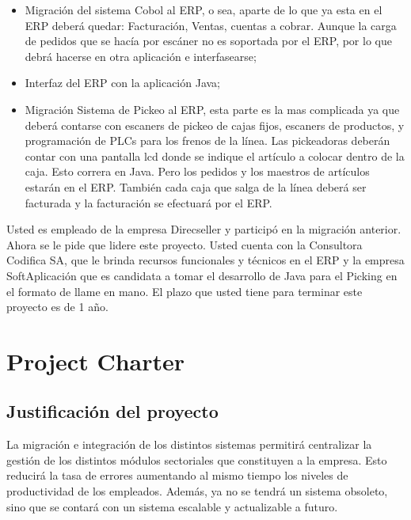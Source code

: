 \documentclass{article}
\begin{document}
	\begin{itemize}
		\itemsep=3pt \topsep=0pt \partopsep=0pt \parskip=0pt \parsep=0pt

		\item Migración del sistema Cobol al ERP, o sea, aparte de lo que ya esta en el ERP deberá quedar: Facturación, Ventas, cuentas a cobrar. Aunque la carga de pedidos que se hacía por escáner no es soportada por el ERP, por lo que debrá hacerse en otra aplicación e interfasearse;

		\item Interfaz del ERP con la aplicación Java;

		\item Migración Sistema de Pickeo al ERP, esta parte es la mas complicada ya que deberá contarse con escaners de pickeo de cajas fijos, escaners de productos, y programación de PLCs para los frenos de la línea. Las pickeadoras deberán contar con una pantalla lcd donde se indique el artículo a colocar dentro de la caja. Esto correra en Java. Pero los pedidos y los maestros de artículos estarán en el ERP. También cada caja que salga de la línea deberá ser facturada y la facturación se efectuará por el ERP.

	\end{itemize}
	\medskip

	Usted es empleado de la empresa Direcseller y participó en la migración anterior. Ahora se le pide que lidere este proyecto. Usted cuenta con la Consultora Codifica SA, que le brinda recursos funcionales y técnicos en el ERP y la empresa SoftAplicación que es candidata a tomar el desarrollo de Java para el Picking en el formato de llame en mano. El plazo que usted tiene para terminar este proyecto es de 1 año.

\bigskip




%
%
\section{Project Charter}
	

\subsection{Justificación del proyecto}

	La migración  e integración de los distintos sistemas permitirá centralizar la gestión de los distintos módulos sectoriales que constituyen a la empresa. Esto reducirá la tasa de errores aumentando al mismo tiempo los niveles de productividad de los empleados. Además, ya no se tendrá un sistema obsoleto, sino que se contará con un sistema escalable y actualizable a futuro.
\medskip
\end{document}
